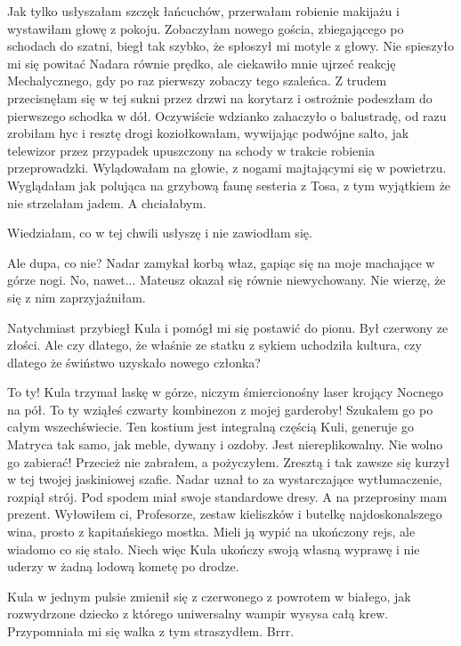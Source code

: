 Jak tylko usłyszałam szczęk łańcuchów, przerwałam robienie makijażu i wystawiłam głowę z pokoju.
Zobaczyłam nowego gościa, zbiegającego po schodach do szatni, biegł tak szybko, że spłoszył mi motyle z głowy.
Nie spieszyło mi się powitać Nadara równie prędko, ale ciekawiło mnie ujrzeć reakcję Mechalycznego, gdy po raz pierwszy zobaczy tego szaleńca.
Z trudem przecisnęłam się w tej sukni przez drzwi na korytarz i ostrożnie podeszłam do pierwszego schodka w dół.
Oczywiście wdzianko zahaczyło o balustradę, od razu zrobiłam hyc i resztę drogi koziołkowałam, 
wywijając podwójne salto, jak telewizor przez przypadek upuszczony na schody w trakcie robienia przeprowadzki.
Wylądowałam na głowie, z nogami majtającymi się w powietrzu.
Wyglądałam jak polująca na grzybową faunę sesteria z Tosa, z tym wyjątkiem że nie strzelałam jadem. A chciałabym.

Wiedziałam, co w tej chwili usłyszę i nie zawiodłam się.

\begin{dialogue}
\ds{} Ale dupa, co nie? \dm{} Nadar zamykał korbą właz, gapiąc się na moje machające w górze nogi.
\ds{} No, nawet... \dm{} Mateusz okazał się równie niewychowany. Nie wierzę, że się z nim zaprzyjaźniłam.
\end{dialogue}

Natychmiast przybiegł Kula i pomógł mi się postawić do pionu. Był czerwony ze złości.
Ale czy dlatego, że właśnie ze statku z sykiem uchodziła kultura, czy dlatego że świństwo uzyskało nowego członka?

\begin{dialogue}
\ds{} To ty! \dm{} Kula trzymał laskę w górze, niczym śmiercionośny laser krojący Nocnego na pół. \dm{} 
To ty wziąłeś czwarty kombinezon z mojej garderoby! 
Szukałem go po całym wszechświecie. Ten kostium jest integralną częścią Kuli, generuje go Matryca tak samo, jak meble, dywany i ozdoby.
Jest niereplikowalny. Nie wolno go zabierać!
\ds{} Przecież nie zabrałem, a pożyczyłem. Zresztą i tak zawsze się kurzył w tej twojej jaskiniowej szafie. \dm{}
Nadar uznał to za wystarczające wytłumaczenie, rozpiął strój. Pod spodem miał swoje standardowe dresy. \dm{} 
A na przeprosiny mam prezent. Wyłowiłem ci, Profesorze, zestaw kieliszków i butelkę najdoskonalszego wina, prosto z kapitańskiego mostka.
Mieli ją wypić na ukończony rejs, ale wiadomo co się stało. Niech więc Kula ukończy swoją własną wyprawę i nie uderzy w żadną lodową kometę po drodze.
\end{dialogue}

Kula w jednym pulsie zmienił się z czerwonego z powrotem w białego, jak rozwydrzone dziecko z którego uniwersalny wampir wysysa całą krew.
Przypomniała mi się walka z tym straszydłem. Brrr.

